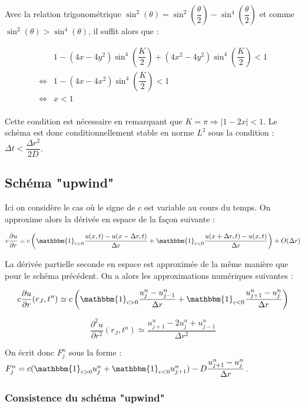 \documentclass[a4paper,fleqn,leqno]{article}
\begin{document}
Avec la relation trigonométrique $\sin^2(\theta) = \sin^2(\dfrac{\theta}{2}) - \sin^4(\dfrac{\theta}{2})$ et comme $\sin^2(\theta) > \sin^4(\theta)$, il suffit alors que :

\begin{align*}
& 1 - (4x - 4y^2)\sin^4(\dfrac{K}{2}) + (4x^2 - 4y^2)\sin^4(\dfrac{K}{2}) < 1\\
\Leftrightarrow & 1 - (4x - 4x^2)\sin^4(\dfrac{K}{2}) < 1\\
\Leftrightarrow & x < 1\\
\end{align*}

Cette condition est nécessaire en remarquant que $K = \pi \Rightarrow \lvert 1 - 2x \rvert < 1$.
Le schéma est donc conditionnellement stable en norme $L^2$ sous la condition :$\Delta t < \dfrac{\Delta r^2}{2D}$.




\subsection{Schéma "upwind"}

Ici on considère le cas où le signe de $c$ est variable au cours du temps. On approxime alors la dérivée en espace de la façon suivante :

\[c\dfrac{\partial u}{\partial r} = c\left(\mathbbm{1}_{c>0}\dfrac{u(x,t) - u(x-\Delta r,t)}{\Delta r}+\mathbbm{1}_{c<0}\dfrac{u(x+\Delta r,t) - u(x,t)}{\Delta r}\right) + O(\Delta r)\]

La dérivée partielle seconde en espace est approximée de la même manière que pour le schéma précédent. On a alors les approximations numériques suivantes :

\[c\dfrac{\partial u}{\partial r}(r_J,t^n) \simeq c\left(\mathbbm{1}_{c>0}\dfrac{u_{j}^n-u_{j-1}^n}{\Delta r} + \mathbbm{1}_{c<0}\dfrac{u_{j+1}^n-u_{j}^n}{\Delta r}\right)\]

\[\dfrac{\partial^2 u}{\partial r^2}(r_J,t^n) \simeq \dfrac{u^n_{j+1}-2u^n_j+u^n_{j-1}}{\Delta r^2}\]

On écrit donc $F^n_j$ sous la forme : $F^n_j = c(\mathbbm{1}_{c>0}u^n_j + \mathbbm{1}_{c<0}u^n_{j+1}) - D\dfrac{u^n_{j+1} - u^n_j}{\Delta r}$.



\subsubsection{Consistence du schéma "upwind"}
\end{document}
